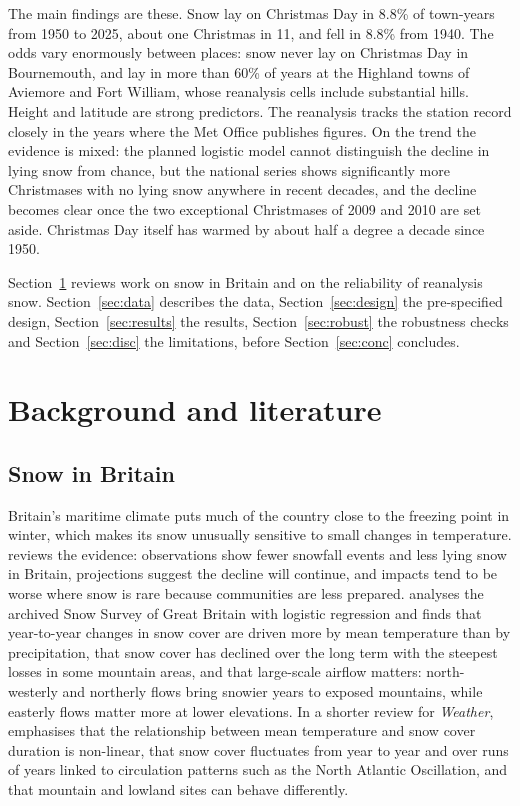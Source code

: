 \documentclass[11pt,a4paper]{article}
\begin{document}
The main findings are these. Snow lay on Christmas Day in 8.8\% of town-years from 1950 to 2025, about one Christmas in 11, and fell in 8.8\% from 1940. The odds vary enormously between places: snow never lay on Christmas Day in Bournemouth, and lay in more than 60\% of years at the Highland towns of Aviemore and Fort William, whose reanalysis cells include substantial hills. Height and latitude are strong predictors. The reanalysis tracks the station record closely in the years where the Met Office publishes figures. On the trend the evidence is mixed: the planned logistic model cannot distinguish the decline in lying snow from chance, but the national series shows significantly more Christmases with no lying snow anywhere in recent decades, and the decline becomes clear once the two exceptional Christmases of 2009 and 2010 are set aside. Christmas Day itself has warmed by about half a degree a decade since 1950.

Section~\ref{sec:lit} reviews work on snow in Britain and on the reliability of reanalysis snow. Section~\ref{sec:data} describes the data, Section~\ref{sec:design} the pre-specified design, Section~\ref{sec:results} the results, Section~\ref{sec:robust} the robustness checks and Section~\ref{sec:disc} the limitations, before Section~\ref{sec:conc} concludes.

\section{Background and literature}\label{sec:lit}
\subsection{Snow in Britain}
Britain's maritime climate puts much of the country close to the freezing point in winter, which makes its snow unusually sensitive to small changes in temperature. \citet{kay2016} reviews the evidence: observations show fewer snowfall events and less lying snow in Britain, projections suggest the decline will continue, and impacts tend to be worse where snow is rare because communities are less prepared. \citet{brown2019} analyses the archived Snow Survey of Great Britain with logistic regression and finds that year-to-year changes in snow cover are driven more by mean temperature than by precipitation, that snow cover has declined over the long term with the steepest losses in some mountain areas, and that large-scale airflow matters: north-westerly and northerly flows bring snowier years to exposed mountains, while easterly flows matter more at lower elevations. In a shorter review for \textit{Weather}, \citet{brown2020} emphasises that the relationship between mean temperature and snow cover duration is non-linear, that snow cover fluctuates from year to year and over runs of years linked to circulation patterns such as the North Atlantic Oscillation, and that mountain and lowland sites can behave differently.
\end{document}
